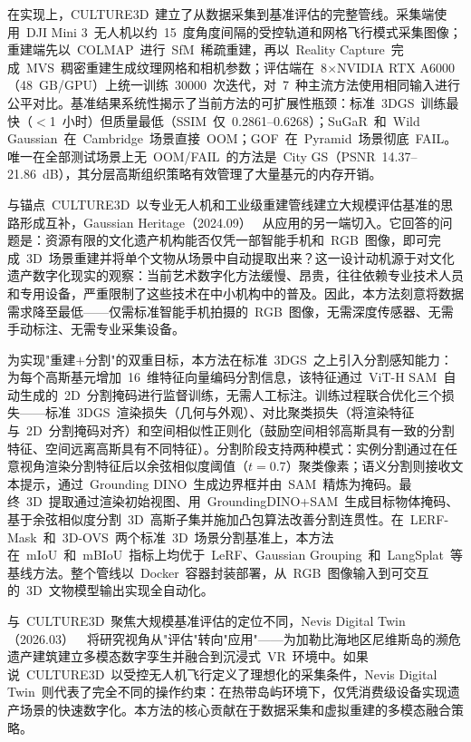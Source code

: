 在实现上，CULTURE3D~建立了从数据采集到基准评估的完整管线。采集端使用~DJI Mini 3~无人机以约~15~度角度间隔的受控轨道和网格飞行模式采集图像；重建端先以~COLMAP~进行~SfM~稀疏重建，再以~Reality Capture~完成~MVS~稠密重建生成纹理网格和相机参数；评估端在~8$\times$NVIDIA RTX A6000（48~GB/GPU）上统一训练~30000~次迭代，对~7~种主流方法使用相同输入进行公平对比。基准结果系统性揭示了当前方法的可扩展性瓶颈：标准~3DGS~训练最快（$<$1~小时）但质量最低（SSIM~仅~0.2861--0.6268）；SuGaR~和~Wild Gaussian~在~Cambridge~场景直接~OOM；GOF~在~Pyramid~场景彻底~FAIL。唯一在全部测试场景上无~OOM/FAIL~的方法是~City GS（PSNR~14.37--21.86~dB），其分层高斯组织策略有效管理了大量基元的内存开销。

与锚点~CULTURE3D~以专业无人机和工业级重建管线建立大规模评估基准的思路形成互补，Gaussian Heritage（2024.09）~\cite{2409_19039} 从应用的另一端切入。它回答的问题是：资源有限的文化遗产机构能否仅凭一部智能手机和~RGB~图像，即可完成~3D~场景重建并将单个文物从场景中自动提取出来？这一设计动机源于对文化遗产数字化现实的观察：当前艺术数字化方法缓慢、昂贵，往往依赖专业技术人员和专用设备，严重限制了这些技术在中小机构中的普及。因此，本方法刻意将数据需求降至最低——仅需标准智能手机拍摄的~RGB~图像，无需深度传感器、无需手动标注、无需专业采集设备。

为实现"重建$+$分割"的双重目标，本方法在标准~3DGS~之上引入分割感知能力：为每个高斯基元增加~16~维特征向量编码分割信息，该特征通过~ViT-H SAM~自动生成的~2D~分割掩码进行监督训练，无需人工标注。训练过程联合优化三个损失——标准~3DGS~渲染损失（几何与外观）、对比聚类损失（将渲染特征与~2D~分割掩码对齐）和空间相似性正则化（鼓励空间相邻高斯具有一致的分割特征、空间远离高斯具有不同特征）。分割阶段支持两种模式：实例分割通过在任意视角渲染分割特征后以余弦相似度阈值（$t=0.7$）聚类像素；语义分割则接收文本提示，通过~Grounding DINO~生成边界框并由~SAM~精炼为掩码。最终~3D~提取通过渲染初始视图、用~GroundingDINO+SAM~生成目标物体掩码、基于余弦相似度分割~3D~高斯子集并施加凸包算法改善分割连贯性。在~LERF-Mask~和~3D-OVS~两个标准~3D~场景分割基准上，本方法在~mIoU~和~mBIoU~指标上均优于~LeRF、Gaussian Grouping~和~LangSplat~等基线方法。整个管线以~Docker~容器封装部署，从~RGB~图像输入到可交互的~3D~文物模型输出实现全自动化。

与~CULTURE3D~聚焦大规模基准评估的定位不同，Nevis Digital Twin（2026.03）~\cite{2603_20560}~将研究视角从"评估"转向"应用"——为加勒比海地区尼维斯岛的濒危遗产建筑建立多模态数字孪生并融合到沉浸式~VR~环境中。如果说~CULTURE3D~以受控无人机飞行定义了理想化的采集条件，Nevis Digital Twin~则代表了完全不同的操作约束：在热带岛屿环境下，仅凭消费级设备实现遗产场景的快速数字化。本方法的核心贡献在于数据采集和虚拟重建的多模态融合策略。

